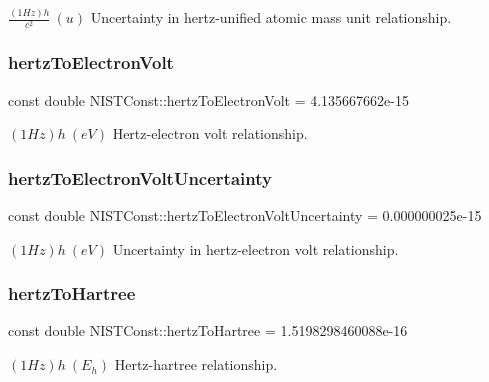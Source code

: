 $\frac{(1 Hz)h}{c^2} \ (u)$ Uncertainty in hertz-\/unified atomic mass unit relationship. \mbox{\label{group___n_i_s_t_const-_hertz_ga035f43de5d8ad8208675c53a0057d14d}} 
\subsubsection{\texorpdfstring{hertz\+To\+Electron\+Volt}{hertzToElectronVolt}}
{\footnotesize\ttfamily const double N\+I\+S\+T\+Const\+::hertz\+To\+Electron\+Volt = 4.\+135667662e-\/15}

$(1 Hz)h \ (eV)$ Hertz-\/electron volt relationship. \mbox{\label{group___n_i_s_t_const-_hertz_ga695a041e052cf0684ddbf956b7b8df80}} 
\subsubsection{\texorpdfstring{hertz\+To\+Electron\+Volt\+Uncertainty}{hertzToElectronVoltUncertainty}}
{\footnotesize\ttfamily const double N\+I\+S\+T\+Const\+::hertz\+To\+Electron\+Volt\+Uncertainty = 0.\+000000025e-\/15}

$(1 Hz)h \ (eV)$ Uncertainty in hertz-\/electron volt relationship. \mbox{\label{group___n_i_s_t_const-_hertz_ga2ededb8b750b44cde6d83c1c07b6a870}} 
\subsubsection{\texorpdfstring{hertz\+To\+Hartree}{hertzToHartree}}
{\footnotesize\ttfamily const double N\+I\+S\+T\+Const\+::hertz\+To\+Hartree = 1.\+5198298460088e-\/16}

$(1 Hz)h \ (E_h)$ Hertz-\/hartree relationship. \mbox{\label{group___n_i_s_t_const-_hertz_gaa2e1f37030bea54753040b6728792d90}} 
